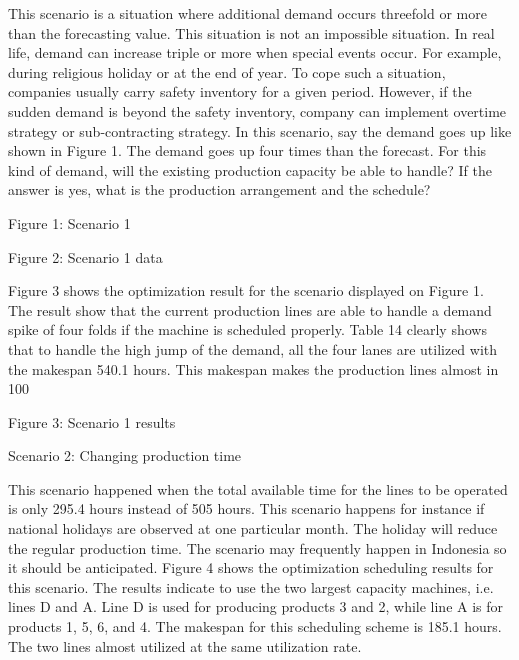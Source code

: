 \documentclass[a4paper,11pt,fleqn]{report}
\begin{document}
                This scenario is a situation where additional demand occurs threefold or more than the forecasting value. This situation is not an impossible situation. In real life, demand can increase triple or more when special events occur. For example, during religious holiday or at the end of year. To cope such a situation, companies usually carry safety inventory for a given period. However, if the sudden demand is beyond the safety inventory, company can implement overtime strategy or sub-contracting strategy. In this scenario, say the demand goes up like shown in Figure 1. The demand goes up four times than the forecast. For this kind of demand, will the existing production capacity be able to handle? If the answer is yes, what is the production arrangement and the schedule?
                
                Figure 1: Scenario 1
                
                Figure 2: Scenario 1 data
                
                Figure 3 shows the optimization result for the scenario displayed on Figure 1. The result show that the current production lines are able to handle a demand spike of four folds if the machine is scheduled properly. Table 14 clearly shows that to handle the high jump of the demand, all the four lanes are utilized with the makespan 540.1 hours. This makespan makes the production lines almost in 100%
                
                Figure 3: Scenario 1 results
                
                Scenario 2: Changing production time
                
                This scenario happened when the total available time for the lines to be operated is only 295.4 hours instead of 505 hours. This scenario happens for instance if national holidays are observed at one particular month. The holiday will reduce the regular production time. The scenario may frequently happen in Indonesia so it should be anticipated. Figure 4 shows the optimization scheduling results for this scenario. The results indicate to use the two largest capacity machines, i.e. lines D and A. Line D is used for producing products 3 and 2, while line A is for products 1, 5, 6, and 4. The makespan for this scheduling scheme is 185.1 hours. The two lines almost utilized at the same utilization rate.
                
\end{document}
